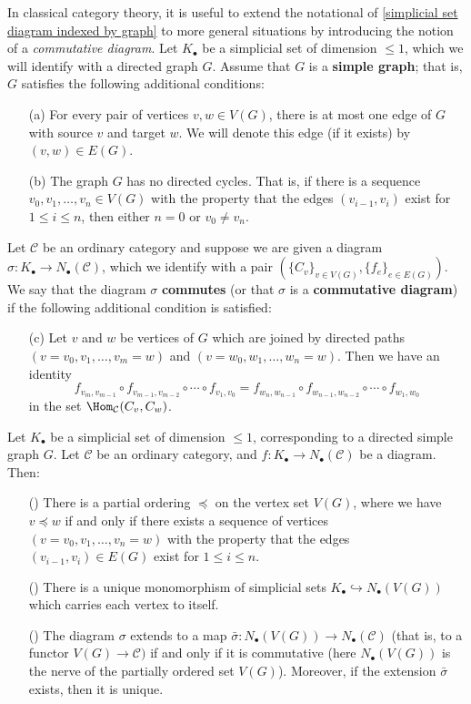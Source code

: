 In classical category theory, it is useful to extend the notational of \cref{simplicial set diagram indexed by graph} to more general situations by introducing the notion of a \textit{commutative diagram}. Let $K_\bullet$ be a simplicial set of dimension $\leq 1$, which we will identify with a directed graph $G$. Assume that $G$ is a \textbf{simple graph}; that is, $G$ satisfies the following additional conditions:
\begin{itemize}
\item[(a)] For every pair of vertices $v,w\in V(G)$, there is at most one edge of $G$ with source $v$ and target $w$. We will denote this edge (if it exists) by $(v,w)\in E(G)$.
\item[(b)] The graph $G$ has no directed cycles. That is, if there is a sequence $v_0,v_1,\dots,v_n\in V(G)$ with the property that the edges $(v_{i-1},v_i)$ exist for $1\leq i\leq n$, then either $n=0$ or $v_0\neq v_n$.
\end{itemize}
Let $\mathcal{C}$ be an ordinary category and suppose we are given a diagram $\sigma:K_\bullet\to N_\bullet(\mathcal{C})$, which we identify with a pair $(\{C_v\}_{v\in V(G)},\{f_e\}_{e\in E(G)})$. We say that the diagram $\sigma$ \textbf{commutes} (or that $\sigma$ is a \textbf{commutative diagram}) if the following additional condition is satisfied:
\begin{itemize}
\item[(c)] Let $v$ and $w$ be vertices of $G$ which are joined by directed paths $(v=v_0,v_1,\dots,v_m=w)$ and $(v=w_0,w_1,\dots,w_n=w)$. Then we have an identity
\[f_{v_m,v_{m-1}}\circ f_{v_{m-1},v_{m-2}}\circ\cdots\circ f_{v_1,v_0}=f_{w_n,w_{n-1}}\circ f_{w_{n-1},w_{n-2}}\circ\cdots\circ f_{w_1,w_0}\]
in the set $\Hom_{\mathcal{C}}(C_v,C_w)$.
\end{itemize}
\begin{proposition}\label{simplicial set diagram commutes iff extend to functor}
Let $K_\bullet$ be a simplicial set of dimension $\leq 1$, corresponding to a directed simple graph $G$. Let $\mathcal{C}$ be an ordinary category, and $f:K_\bullet\to N_\bullet(\mathcal{C})$ be a diagram. Then:
\begin{itemize}
\item[(\rmnum{1})] There is a partial ordering $\preceq$ on the vertex set $V(G)$, where we have $v\preceq w$ if and only if there exists a sequence of vertices $(v=v_0,v_1,\dots,v_n=w)$ with the property that the edges $(v_{i-1},v_i)\in E(G)$ exist for $1\leq i\leq n$.
\item[(\rmnum{2})] There is a unique monomorphism of simplicial sets $K_\bullet\hookrightarrow N_\bullet(V(G))$ which carries each vertex to itself.
\item[(\rmnum{3})] The diagram $\sigma$ extends to a map $\bar{\sigma}:N_\bullet(V(G))\to N_\bullet(\mathcal{C})$ (that is, to a functor $V(G)\to\mathcal{C})$ if and only if it is commutative (here $N_\bullet(V(G))$ is the nerve of the partially ordered set $V(G)$). Moreover, if the extension $\bar{\sigma}$ exists, then it is unique.
\end{itemize}
\end{proposition}
